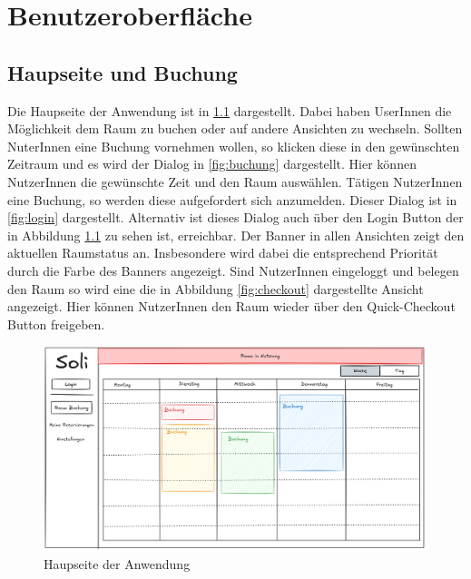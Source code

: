 
\chapter{Benutzeroberfläche}
\label{chap:ui}

\section{Haupseite und Buchung}

Die Haupseite der Anwendung ist in \ref{fig:hauptseite} dargestellt. Dabei haben UserInnen die Möglichkeit dem Raum zu buchen oder auf andere Ansichten zu wechseln.
Sollten NuterInnen eine Buchung vornehmen wollen, so klicken diese in den gewünschten Zeitraum und es wird der Dialog in \ref{fig:buchung} dargestellt. Hier können NutzerInnen die gewünschte Zeit und den Raum auswählen.
Tätigen NutzerInnen eine Buchung, so werden diese aufgefordert sich anzumelden. Dieser Dialog ist in \ref{fig:login} dargestellt. Alternativ ist dieses Dialog auch über den Login Button der in Abbildung \ref{fig:hauptseite} zu sehen ist, erreichbar.
Der Banner in allen Ansichten zeigt den aktuellen Raumstatus an. Insbesondere wird dabei die entsprechend Priorität durch die Farbe des Banners angezeigt.
Sind NutzerInnen eingeloggt und belegen den Raum so wird eine die in Abbildung \ref{fig:checkout} dargestellte Ansicht angezeigt. Hier können NutzerInnen den Raum wieder über den Quick-Checkout Button freigeben.

\begin{figure}[ht]
    \centering
    \includegraphics[scale=0.15]{figures/MainPageUI.png}
    \caption{Haupseite der Anwendung}
    \label{fig:hauptseite}
\end{figure}

